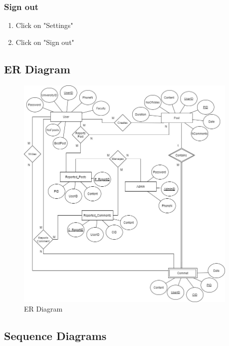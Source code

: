 \documentclass[12pt]{article}
\begin{document}
\subsubsection*{Sign out}
\begin{enumerate}
\itemsep0em 
\item Click on "Settings"
\item Click on "Sign out"
\end{enumerate}
\onecolumn
\sectionbreak
 \subsection{ER Diagram}
\begin{figure}[h!]
\centerline{\includegraphics[width=0.95\textwidth]{./ERDiagram/ERDiagram.JPG}}
  \caption{ER Diagram}
\end{figure}

\vspace{-1em}
\subsection{Sequence Diagrams}
\end{document}
